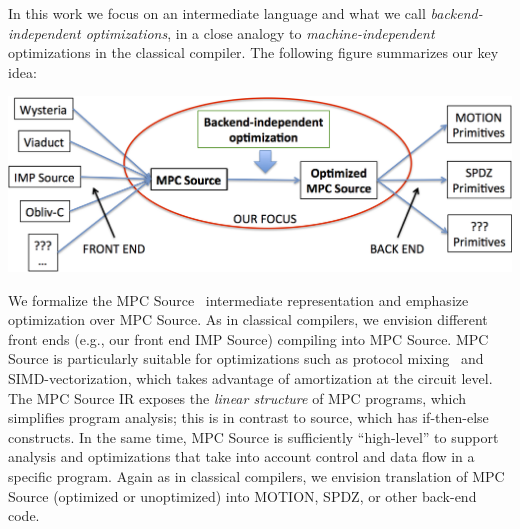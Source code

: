 
In this work we focus on an intermediate language and what we call \emph{backend-independent optimizations}, in a close analogy to \emph{machine-independent} optimizations
in the classical compiler. The following figure summarizes our key idea:

{\begin{center}
\includegraphics[width=0.8\linewidth]{figs_paper_SIMD/focus.png}
\end{center}
}

We formalize the MPC Source~\cite{Ishaq:2019} intermediate representation and emphasize optimization over MPC Source. As in classical compilers, we envision different front ends (e.g., our front end IMP Source) compiling into MPC Source. MPC Source is particularly suitable for optimizations such as protocol mixing~\cite{CCS:BDKKS18,Ishaq:2019, Fang:2022} and SIMD-vectorization,
which takes advantage of amortization at the circuit level. The MPC Source IR exposes the \emph{linear structure} of MPC programs, which simplifies program analysis; this is
in contrast to source, which has if-then-else constructs. In the same time, MPC Source is sufficiently ``high-level''  to support analysis and optimizations that take into account
control and data flow in a specific program. %
Again as in classical compilers, we envision translation of MPC Source (optimized or unoptimized) into MOTION, SPDZ, or other back-end code.




